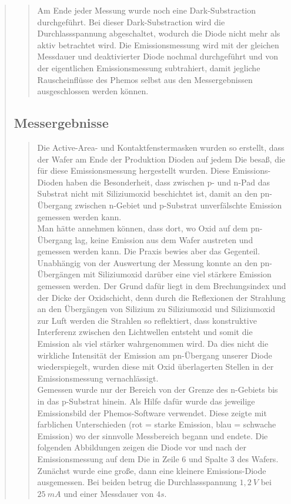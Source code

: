 \begin{quote}
\begin{quote}
        Am Ende jeder Messung wurde noch eine Dark-Substraction durchgeführt.
        Bei dieser Dark-Substraction wird die Durchlassspannung abgeschaltet,
        wodurch die Diode nicht mehr als aktiv betrachtet wird. Die Emissionsmessung wird mit der
        gleichen Messdauer und deaktivierter Diode nochmal durchgeführt und von
        der eigentlichen Emissionsmessung subtrahiert, damit jegliche
        Rauscheinflüsse des Phemos selbst aus den Messergebnissen ausgeschlossen
        werden können.

        \end{quote}

        \subsection{Messergebnisse}
        \begin{quote}

        Die Active-Area- und Kontaktfenstermasken wurden so erstellt, dass der
        Wafer am Ende der Produktion Dioden auf jedem Die besaß, die für diese
        Emissionsmessung hergestellt wurden. Diese Emissions-Dioden haben die
        Besonderheit, dass zwischen p- und n-Pad das Substrat nicht mit Siliziumoxid beschichtet
        ist, damit an den pn-Übergang zwischen n-Gebiet und p-Substrat
        unverfälschte Emission gemessen werden kann.\\
        Man hätte annehmen können, dass dort, wo Oxid auf dem pn-Übergang lag,
        keine Emission aus dem Wafer austreten und gemessen werden kann. Die Praxis bewies aber das
        Gegenteil. Unabhängig von der Auswertung der Messung
        konnte an den pn-Übergängen mit Siliziumoxid darüber eine viel stärkere
        Emission gemessen werden. Der Grund dafür liegt in dem Brechungsindex
        und der Dicke der Oxidschicht, denn durch die Reflexionen der Strahlung an
        den Übergängen von Silizium zu Siliziumoxid und Siliziumoxid zur Luft
        werden die Strahlen so reflektiert, dass konstruktive Interferenz
        zwischen den Lichtwellen entsteht und somit die Emission als viel
        stärker wahrgenommen wird. Da dies nicht die wirkliche Intensität der
        Emission am pn-Übergang unserer Diode wiederspiegelt, wurden diese mit
        Oxid überlagerten Stellen in der Emissionsmessung vernachlässigt.\\

        Gemessen wurde nur der Bereich von der Grenze des n-Gebiets bis in
        das p-Substrat hinein. Als Hilfe dafür wurde das jeweilige Emissionsbild
        der Phemos-Software verwendet. Diese zeigte mit farblichen Unterschieden
        (rot = starke Emission, blau = schwache Emission) wo der sinnvolle
        Messbereich begann und endete. Die folgenden Abbildungen zeigen die
        Diode vor und nach der Emissionsmessung auf dem Die in Zeile $6$ und
        Spalte $3$ des Wafers. Zunächst wurde eine große, dann eine kleinere
        Emissions-Diode ausgemessen. Bei beiden betrug die Durchlassspannung
        $1,2\ V$ bei $25\ mA$ und einer Messdauer von $4s$.


\end{quote}
\end{quote}
